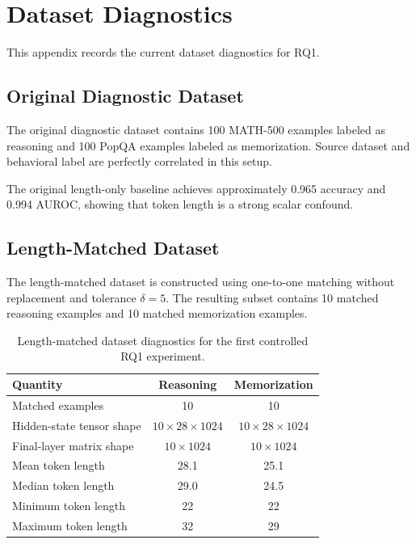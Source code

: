 \documentclass[11pt]{article}
\begin{document}
\section{Dataset Diagnostics}

This appendix records the current dataset diagnostics for RQ1.

\subsection{Original Diagnostic Dataset}

The original diagnostic dataset contains 100 MATH-500 examples labeled
as reasoning and 100 PopQA examples labeled as memorization. Source
dataset and behavioral label are perfectly correlated in this setup.

The original length-only baseline achieves approximately 0.965
accuracy and 0.994 AUROC, showing that token length is a strong scalar
confound.

\subsection{Length-Matched Dataset}

The length-matched dataset is constructed using one-to-one matching
without replacement and tolerance \(\delta=5\). The resulting subset
contains 10 matched reasoning examples and 10 matched memorization
examples.

\begin{table}[H]
    \centering
    \begin{tabular}{lcc}
        \toprule
        Quantity & Reasoning & Memorization \\
        \midrule
        Matched examples & 10 & 10 \\
        Hidden-state tensor shape & \(10 \times 28 \times 1024\) &
        \(10 \times 28 \times 1024\) \\
        Final-layer matrix shape & \(10 \times 1024\) &
        \(10 \times 1024\) \\
        Mean token length & 28.1 & 25.1 \\
        Median token length & 29.0 & 24.5 \\
        Minimum token length & 22 & 22 \\
        Maximum token length & 32 & 29 \\
        \bottomrule
    \end{tabular}
    \caption{
    Length-matched dataset diagnostics for the first controlled RQ1
    experiment.
    }
    \label{tab:appendix-length-matched-diagnostics}
\end{table}
\end{document}
